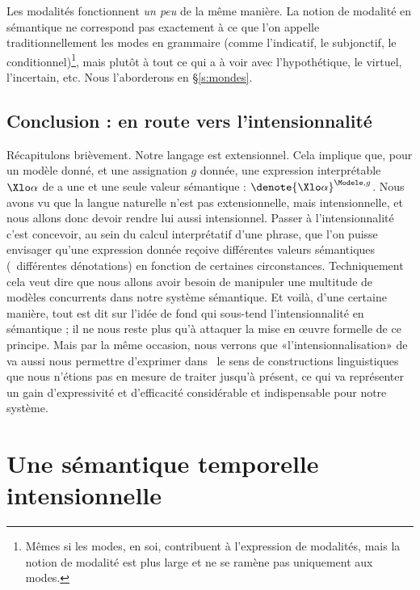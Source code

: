 \fussy

Les modalités fonctionnent \emph{un peu} de la même manière. La notion de modalité en sémantique ne correspond pas exactement à ce que l'on appelle traditionnellement les modes en grammaire (comme l'indicatif, le subjonctif, le conditionnel)\footnote{Mêmes si les modes, en soi, contribuent à l'expression de modalités, mais la notion de modalité est plus large et ne se ramène pas uniquement aux modes.}, mais plutôt à tout ce qui a à voir avec l'hypothétique, le virtuel, l'incertain, etc.   Nous l'aborderons en \S\ref{s:mondes}.




\subsection{Conclusion : en route vers l'intensionnalité}

Récapitulons brièvement. Notre langage {\LO} est extensionnel.
Cela implique que, pour un modèle {\Modele} donné, et une assignation
$g$ donnée, une 
expression interprétable $\Xlo\alpha$ de {\LO} a une et une seule valeur
sémantique :  \(\denote{\Xlo\alpha}^{\Modele,g}\).  
Nous avons vu que la langue naturelle n'est pas extensionnelle, mais
intensionnelle, et nous allons donc devoir rendre {\LO} lui aussi
intensionnel. 
Passer à l'intensionnalité c'est concevoir, au sein du calcul
interprétatif d'une phrase, que l'on puisse envisager qu'une expression donnée reçoive
différentes valeurs sémantiques (\ie\ différentes dénotations) en fonction
de certaines circonstances.   
Techniquement cela veut dire que nous allons avoir besoin de manipuler
une multitude de modèles concurrents dans notre système sémantique. 
Et voilà, d'une certaine manière, tout est dit sur l'idée de fond
qui sous-tend l'intensionnalité en sémantique ; il ne nous reste plus
qu'à attaquer la mise en \oe uvre formelle de ce principe.
Mais par la même occasion, nous verrons que «l'intensionnalisation»
de {\LO} va aussi nous permettre d'exprimer dans \LO\ le sens de
constructions linguistiques que nous n'étions pas en mesure de traiter
jusqu'à présent, ce qui va représenter un  
gain d'expressivité et d'efficacité considérable et indispensable pour
notre système.


\section{Une sémantique temporelle intensionnelle}
\label{s:Prior}

